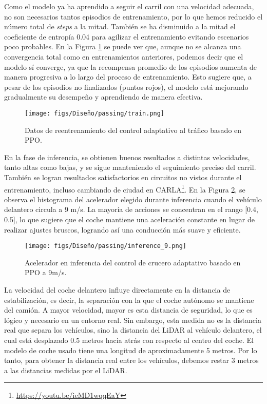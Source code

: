 Como el modelo ya ha aprendido a seguir el carril con una velocidad adecuada, no son necesarios tantos episodios de entrenamiento, por lo que hemos reducido el número total de \textit{steps} a la mitad. También se ha disminuido a la mitad el coeficiente de entropía 0.04 para agilizar el entrenamiento evitando escenarios poco probables. En la Figura \ref{fig:train_traffic} se puede ver que, aunque no se alcanza una convergencia total como en entrenamientos anteriores, podemos decir que el modelo sí converge, ya que la recompensa promedio de los episodios aumenta de manera progresiva a lo largo del proceso de entrenamiento. Esto sugiere que, a pesar de los episodios no finalizados (puntos rojos), el modelo está mejorando gradualmente su desempeño y aprendiendo de manera efectiva.
\begin{figure}[ht]
\centering
\texttt{[image: figs/Diseño/passing/train.png]}
\caption{Datos de reentrenamiento del control adaptativo al tráfico basado en \ac{PPO}.}
\label{fig:train_traffic}
\end{figure}

En la fase de inferencia, se obtienen buenos resultados a distintas velocidades, tanto altas como bajas, y se sigue manteniendo el seguimiento preciso del carril. También se logran resultados satisfactorios en circuitos no vistos durante el entrenamiento, incluso cambiando de ciudad en CARLA\footnote{\url{https://youtu.be/ieMD1wqqEaY}}. En la Figura \ref{fig:infrence_passing}, se observa el histograma del acelerador elegido durante inferencia cuando el vehículo delantero circula a 9 m/s. La mayoría de acciones se concentran en el rango [0.4, 0.5], lo que sugiere que el coche mantiene una aceleración constante en lugar de realizar ajustes bruscos, logrando así una conducción más suave y eficiente.

\begin{figure}[ht]
\centering
\texttt{[image: figs/Diseño/passing/inference\_9.png]}
\caption{Acelerador en inferencia del control de crucero adaptativo basado en \ac{PPO} a 9m/s.}
\label{fig:infrence_passing}
\end{figure}

La velocidad del coche delantero influye directamente en la distancia de estabilización, es decir, la separación con la que el coche autónomo se mantiene del camión. A mayor velocidad, mayor es esta distancia de seguridad, lo que es lógico y necesario en un entorno real. Sin embargo, esta medida no es la distancia real que separa los vehículos, sino la distancia del \ac{LiDAR} al vehículo delantero, el cual está desplazado 0.5 metros hacia atrás con respecto al centro del coche. El modelo de coche usado tiene una longitud de aproximadamente 5 metros. Por lo tanto, para obtener la distancia real entre los vehículos, debemos restar 3 metros a las distancias medidas por el \ac{LiDAR}.

